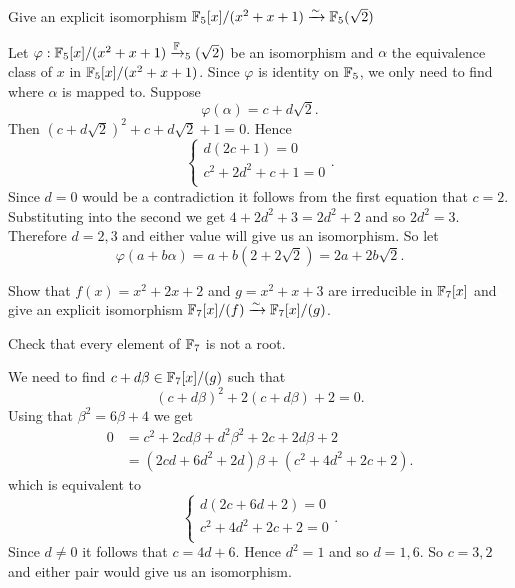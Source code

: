 \begin{ex}{22.6}
    Give an explicit isomorphism $\mathbb{F}_5[x]/(x^2+x+1)\xrightarrow\sim \mathbb{F}_5(\sqrt{2})$
\end{ex}
\begin{sol}
    Let $\varphi:\mathbb{F}_5[x]/(x^2+x+1)\xrightarrow {\mathbb{F}}_5(\sqrt{2})$ be an isomorphism and $\alpha$ the equivalence class of $x$ in $\mathbb{F}_5[x]/(x^2+x+1)$. 
    Since $\varphi$ is identity on $\mathbb{F}_5$, we only need to find where $\alpha$ is mapped to.
    Suppose
    $$\varphi(\alpha)=c+d\sqrt{2}.$$
    Then $\left(c+d\sqrt{2}\right)^2+c+d\sqrt{2}+1=0$. Hence 
    \begin{equation*}
        \begin{cases}
            d(2c+1)=0\\
            c^2+2d^2+c+1=0\\
        \end{cases}.
    \end{equation*}
     Since $d=0$ would be a contradiction it follows from the first equation that $c=2$.
     Substituting into the second we get $4+2d^2+3=2d^2+2$ and so $2d^2=3$. Therefore $d=2,3$ and either value will give us an isomorphism.
     So let
     $$\varphi(a+b\alpha)=a+b(2+2\sqrt{2})= 2a+2b\sqrt{2}.$$
\end{sol}

\begin{ex}{22.7}
    Show that $f(x)=x^2+2x+2$ and $g=x^2+x+3$ are irreducible in $\mathbb{F}_7[x]$ and give an explicit isomorphism
    $\mathbb{F}_7[x]/(f)\xrightarrow{\sim}\mathbb{F}_7[x]/(g)$.
\end{ex}
\begin{sol}
    Check that every element of $\mathbb{F}_7$ is not a root.

    We need to find $c+d\beta\in\mathbb{F}_7[x]/(g)$ such that
    $$(c+d\beta)^2+2(c+d\beta)+2=0.$$
    Using that $\beta^2=6\beta+4$ we get
    \begin{align*}
        0 &= c^2+2cd\beta+d^2\beta^2+2c+2d\beta+2\\
        &=(2cd+6d^2+2d)\beta+(c^2+4d^2+2c+2).
    \end{align*}
    which is equivalent to
    $$\begin{cases}
        d(2c+6d+2)=0\\
        c^2+4d^2+2c+2=0\\
    \end{cases}.$$
    Since $d\neq0$ it follows that $c=4d+6$. Hence $d^2=1$ and so $d=1,6$.
    So $c=3,2$ and either pair would give us an isomorphism. 
\end{sol}

